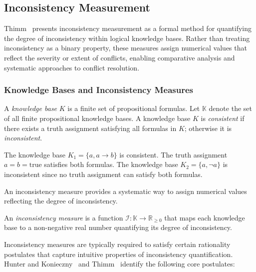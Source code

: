 \subsection{Inconsistency Measurement}
\label{sec:foundations_inconsistency}

Thimm~\cite{Thimm2019} presents inconsistency measurement as a formal method for quantifying the degree of inconsistency within logical knowledge bases. Rather than treating inconsistency as a binary property, these measures assign numerical values that reflect the severity or extent of conflicts, enabling comparative analysis and systematic approaches to conflict resolution.

\subsubsection{Knowledge Bases and Inconsistency Measures}

\begin{defn}
    \label{defn:knowledge_base}
    A \emph{knowledge base} $K$ is a finite set of propositional formulas. Let $\mathbb{K}$ denote the set of all finite propositional knowledge bases. A knowledge base $K$ is \emph{consistent} if there exists a truth assignment satisfying all formulas in $K$; otherwise it is \emph{inconsistent}.
\end{defn}

\begin{example}
    The knowledge base $K_1 = \{a, a \rightarrow b\}$ is consistent. The truth assignment $a = b = \text{true}$ satisfies both formulas. The knowledge base $K_2 = \{a, \neg a\}$ is inconsistent since no truth assignment can satisfy both formulas.
\end{example}

An inconsistency measure provides a systematic way to assign numerical values reflecting the degree of inconsistency.

\begin{defn}
    \label{defn:inconsistency_measure}
    An \emph{inconsistency measure} is a function $\mathcal{I} : \mathbb{K} \to \mathbb{R}_{\geq 0}$ that maps each knowledge base to a non-negative real number quantifying its degree of inconsistency.
\end{defn}

Inconsistency measures are typically required to satisfy certain rationality postulates that capture intuitive properties of inconsistency quantification. Hunter and Konieczny~\cite{Hunter2008} and Thimm~\cite{Thimm2019} identify the following core postulates:


